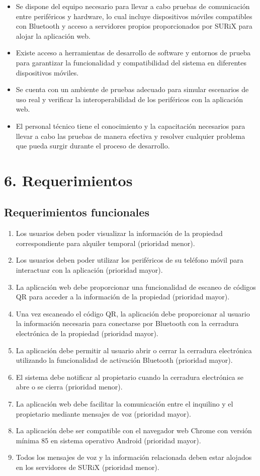 \documentclass[
11pt, %
codirector, %
]{charter}
\begin{document}
\begin{itemize}
	\item Se dispone del equipo necesario para llevar a cabo pruebas de comunicación entre periféricos y hardware, lo cual incluye dispositivos móviles compatibles con Bluetooth y acceso a servidores propios proporcionados por SURiX para alojar la aplicación web.
	\item Existe acceso a herramientas de desarrollo de software y entornos de prueba para garantizar la funcionalidad y compatibilidad del sistema en diferentes dispositivos móviles.
	\item Se cuenta con un ambiente de pruebas adecuado para simular escenarios de uso real y verificar la interoperabilidad de los periféricos con la aplicación web.
        \item El personal técnico tiene el conocimiento y la capacitación necesarios para llevar a cabo las pruebas de manera efectiva y resolver cualquier problema que pueda surgir durante el proceso de desarrollo.
\end{itemize}

\section{6. Requerimientos}

\subsection{Requerimientos funcionales}
\begin{enumerate}
\item Los usuarios deben poder visualizar la información de la propiedad correspondiente para alquiler temporal (prioridad menor).
\item Los usuarios deben poder utilizar los periféricos de su teléfono móvil para interactuar con la aplicación (prioridad mayor).
\item La aplicación web debe proporcionar una funcionalidad de escaneo de códigos QR para acceder a la información de la propiedad (prioridad mayor).
\item Una vez escaneado el código QR, la aplicación debe proporcionar al usuario la información necesaria para conectarse por Bluetooth con la cerradura electrónica de la propiedad (prioridad mayor).
\item La aplicación debe permitir al usuario abrir o cerrar la cerradura electrónica utilizando la funcionalidad de activación Bluetooth (prioridad mayor).
\item El sistema debe notificar al propietario cuando la cerradura electrónica se abre o se cierra (prioridad menor).
\item La aplicación web debe facilitar la comunicación entre el inquilino y el propietario mediante mensajes de voz (prioridad mayor).
\item La aplicación debe ser compatible con el navegador web Chrome con versión mínima 85 en sistema operativo Android (prioridad mayor).
\item Todos los mensajes de voz y la información relacionada deben estar alojados en los servidores de SURiX (prioridad menor).
\end{enumerate}
\end{document}
